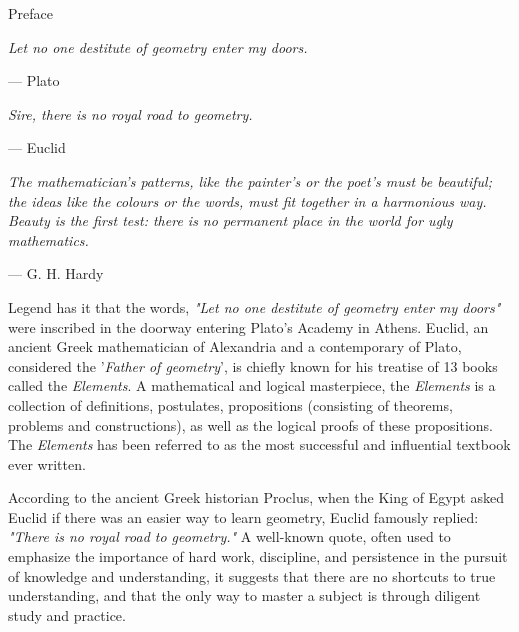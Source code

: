 \documentclass[twoside,11pt]{report}
\begin{document}
\centerline{\LARGE{Preface}}

\hfill

\normalsize %


\hspace{2em}\textit{Let no one destitute of geometry enter my doors.}

\hspace{16em} --- Plato

\hfill

\begin{center}
  \textit{Sire, there is no royal road to geometry.}

  \hspace{11em}--- Euclid
\end{center}

\hfill

\begin{flushright}
  \textit{The mathematician's patterns, like the painter's or the poet's must be beautiful;}\hspace{2em}\null\\
  \textit{the ideas like the colours or the words, must fit together in a harmonious way.}\hspace{2em}\null\\
  \hfill \textit{Beauty is the first test: there is no permanent place in the world for ugly mathematics.}\hspace{2em}\null
\end{flushright}

\hfill --- G. H. Hardy\hspace{2em}\null\\

\hfill

Legend has it that the words, \textit{"Let no one destitute of geometry enter my doors"} were inscribed in the doorway entering Plato's Academy in Athens.  Euclid, an ancient Greek mathematician of Alexandria and a contemporary of Plato, considered the '\textit{Father of geometry}', is chiefly known for his treatise of 13 books called the \textit{Elements}.  A mathematical and logical masterpiece, the \textit{Elements} is a collection of definitions, postulates, propositions (consisting of theorems, problems and constructions), as well as the logical proofs of these propositions.  The \textit{Elements} has been referred to as the most successful and influential textbook ever written.

According to the ancient Greek historian Proclus, when the King of Egypt asked Euclid if there was an easier way to learn geometry, Euclid famously replied: \textit{"There is no royal road to geometry."} A well-known quote, often used to emphasize the importance of hard work, discipline, and persistence in the pursuit of knowledge and understanding, it suggests that there are no shortcuts to true understanding, and that the only way to master a subject is through diligent study and practice.
\end{document}
